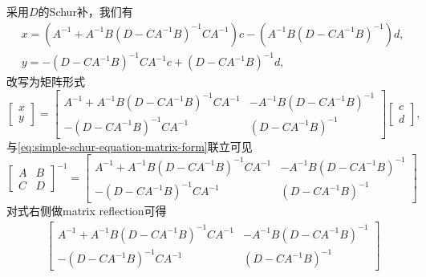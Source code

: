 \begin{subappendices}
采用$D$的Schur补，我们有
\begin{equation*}
  \begin{split}
    &x = \left(
    A^{-1} + A^{-1} B \left(D - C A^{-1} B\right)^{-1} C A^{-1} \right)
    c -
    \left(
    A^{-1} B  \left(D - C A^{-1} B\right)^{-1}
    \right) d, \\
    &y = - \left(D - C A^{-1} B\right)^{-1} C A^{-1} c +
    \left(D - C A^{-1} B\right)^{-1} d,
  \end{split}
\end{equation*}
改写为矩阵形式
\begin{equation}
  \label{eq:simple-schur-D-rewrite-M}
  \begin{bmatrix}
    x \\ y
  \end{bmatrix} =
  \begin{bmatrix}
    A^{-1} + A^{-1} B \left(D - C A^{-1} B\right)^{-1} C A^{-1} &
    -  A^{-1} B  \left(D - C A^{-1} B\right)^{-1} \\
    - \left(D - C A^{-1} B\right)^{-1} C A^{-1} &
    \left(D - C A^{-1} B\right)^{-1}
  \end{bmatrix}
  \begin{bmatrix}
    c \\ d
  \end{bmatrix},
\end{equation}
与\eqref{eq:simple-schur-equation-matrix-form}联立可见
\begin{equation}
  \label{eq:simple-schur-D-equation-matrix-inverse}
  \begin{bmatrix}
    A & B \\ C & D
  \end{bmatrix}^{-1}
  =
  \begin{bmatrix}
    A^{-1} + A^{-1} B \left(D - C A^{-1} B\right)^{-1} C A^{-1} &
    -  A^{-1} B  \left(D - C A^{-1} B\right)^{-1} \\
    - \left(D - C A^{-1} B\right)^{-1} C A^{-1} &
    \left(D - C A^{-1} B\right)^{-1}
  \end{bmatrix}
\end{equation}
对式右侧做matrix reflection可得
\begin{equation*}
  \begin{split}
    &\begin{bmatrix}
      A^{-1} + A^{-1} B \left(D - C A^{-1} B\right)^{-1} C A^{-1} &
      -  A^{-1} B  \left(D - C A^{-1} B\right)^{-1} \\
      - \left(D - C A^{-1} B\right)^{-1} C A^{-1} &
      \left(D - C A^{-1} B\right)^{-1}

\end{bmatrix}
\end{split}
\end{equation*}
\end{subappendices}

